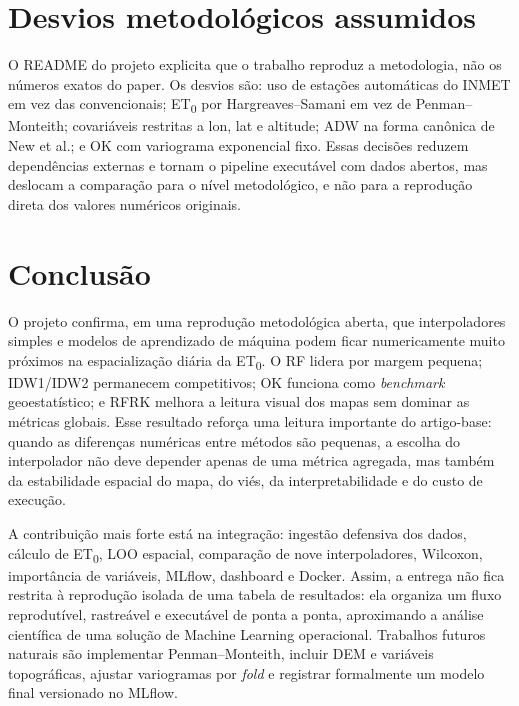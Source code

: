 \section{Desvios metodológicos assumidos}

O README do projeto explicita que o trabalho reproduz a metodologia, não os
números exatos do paper. Os desvios são: uso de estações automáticas do INMET em
vez das convencionais; ET\textsubscript{0} por Hargreaves--Samani em vez de
Penman--Monteith; covariáveis restritas a lon, lat e altitude; ADW na forma
canônica de New et al.; e OK com variograma exponencial fixo. Essas decisões
reduzem dependências externas e tornam o pipeline executável com dados abertos,
mas deslocam a comparação para o nível metodológico, e não para a reprodução
direta dos valores numéricos originais.

\section{Conclusão}

O projeto confirma, em uma reprodução metodológica aberta, que interpoladores
simples e modelos de aprendizado de máquina podem ficar numericamente muito
próximos na espacialização diária da ET\textsubscript{0}. O RF lidera por margem
pequena; IDW1/IDW2 permanecem competitivos; OK funciona como \emph{benchmark}
geoestatístico; e RFRK melhora a leitura visual dos mapas sem dominar as métricas
globais. Esse resultado reforça uma leitura importante do artigo-base: quando as
diferenças numéricas entre métodos são pequenas, a escolha do interpolador não
deve depender apenas de uma métrica agregada, mas também da estabilidade espacial
do mapa, do viés, da interpretabilidade e do custo de execução.

A contribuição mais forte está na integração: ingestão defensiva dos dados,
cálculo de ET\textsubscript{0}, LOO espacial, comparação de nove interpoladores,
Wilcoxon, importância de variáveis, MLflow, dashboard e Docker. Assim, a entrega
não fica restrita à reprodução isolada de uma tabela de resultados: ela organiza
um fluxo reprodutível, rastreável e executável de ponta a ponta, aproximando a
análise científica de uma solução de Machine Learning operacional. Trabalhos
futuros naturais são implementar Penman--Monteith, incluir DEM e variáveis
topográficas, ajustar variogramas por \emph{fold} e registrar formalmente um
modelo final versionado no MLflow.

